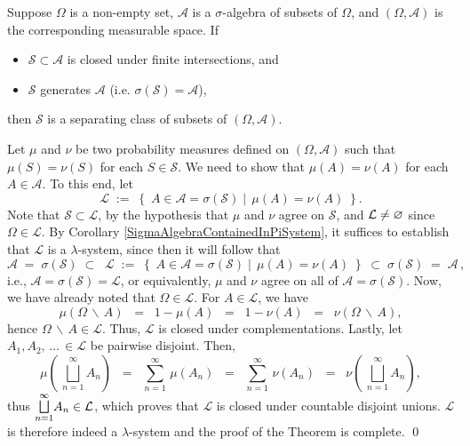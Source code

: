 \begin{theorem}
\label{ClosedUnderFiniteIntersectionsImpliesSeparatingClasses}
\mbox{}\vskip 0.1cm
\noindent
Suppose $\Omega$ is a non-empty set, $\mathcal{A}$ is a $\sigma$-algebra of subsets of $\Omega$,
and $(\Omega,\mathcal{A})$ is the corresponding measurable space.
\vskip 0.1cm
\noindent
If
\begin{itemize}
\item	$\mathcal{S} \subset \mathcal{A}$ is closed under finite intersections, and
\item	$\mathcal{S}$ generates $\mathcal{A}$ (i.e. $\sigma(\mathcal{S}) = \mathcal{A}$),
\end{itemize}
then $\mathcal{S}$ is a separating class of subsets of $\left(\Omega,\mathcal{A}\right)$.
\end{theorem}
\proof
Let $\mu$ and $\nu$ be two probability measures defined on $\left(\Omega,\mathcal{A}\right)$
such that $\mu(S) = \nu(S)$ for each $S \in \mathcal{S}$.
We need to show that $\mu(A) = \nu(A)$ for each $A \in \mathcal{A}$.
To this end, let
\begin{equation*}
\mathcal{L}
\; := \;
\left\{\;
A \in \mathcal{A} = \sigma(\mathcal{S})
\;\left\vert\;\,
\mu(A) = \nu(A)
\right.
\;\right\}.
\end{equation*}
Note that $\mathcal{S} \subset \mathcal{L}$, by the hypothesis that $\mu$ and $\nu$ agree on $\mathcal{S}$,
and $\mathcal{L} \neq \varnothing$ since $\Omega \in \mathcal{L}$.
By Corollary \ref{SigmaAlgebraContainedInPiSystem}, it suffices to establish that
$\mathcal{L}$ is a $\lambda$-system, since then it will follow that
\begin{equation*}
\mathcal{A}
\; = \; \sigma(\mathcal{S})
\; \subset \;\; \mathcal{L}
\; := \;
\left\{\;
A \in \mathcal{A} = \sigma(\mathcal{S})
\;\left\vert\;\,
\mu(A) = \nu(A)
\right.
\;\right\}
\; \subset \; \sigma(\mathcal{S}) \; = \; \mathcal{A}\,,
\end{equation*}
i.e., $\mathcal{A} = \sigma(\mathcal{S}) = \mathcal{L}$,
or equivalently, $\mu$ and $\nu$ agree on all of $\mathcal{A} = \sigma(\mathcal{S})$.
Now, we have already noted that $\Omega \in \mathcal{L}$.
For $A \in \mathcal{L}$, we have
\begin{equation*}
\mu(\Omega\,\backslash\,A)
\;\; = \;\; 1 - \mu(A)
\;\; = \;\; 1 - \nu(A)
\;\; = \;\; \nu(\Omega\,\backslash\,A),
\end{equation*}
hence $\Omega\,\backslash\,A \in \mathcal{L}$.
Thus, $\mathcal{L}$ is closed under complementations.
Lastly, let $A_{1}, A_{2},\,\ldots\,\in\mathcal{L}$ be pairwise disjoint.
Then,
\begin{equation*}
\mu\!\left(\,\bigsqcup_{n=1}^{\infty}A_{n}\right)
\;\; = \;\; \sum_{n=1}^{\infty}\,\mu\!\left(A_{n}\right)
\;\; = \;\; \sum_{n=1}^{\infty}\,\nu\!\left(A_{n}\right)
\;\; = \;\; \nu\!\left(\,\bigsqcup_{n=1}^{\infty}A_{n}\right),
\end{equation*}
thus $\underset{n=1}{\overset{\infty}{\textnormal{\large$\bigsqcup$}}}A_{n} \in \mathcal{L}$,
which proves that $\mathcal{L}$ is closed under countable disjoint unions.
$\mathcal{L}$ is therefore indeed a $\lambda$-system and the proof of the Theorem is complete.
\qed


